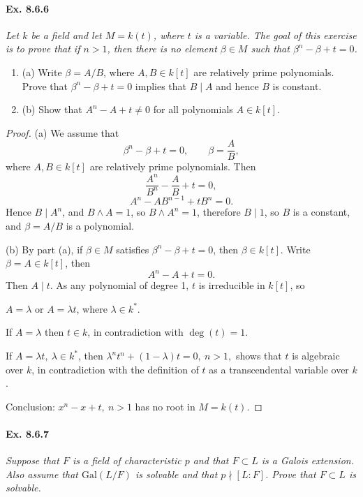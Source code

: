 \documentclass[11pt,a4paper]{article}
\newcommand{\be} {\begin{enumerate}}
\newcommand{\ee} {\end{enumerate}}
\newcommand{\Gal}{\mathrm{Gal}}
\begin{document}
\paragraph{Ex. 8.6.6}

{\it Let $k$ be a field and let $M = k(t)$, where $t$ is a variable. The goal of this exercise is to prove that if $n>1$, then there is no element $\beta \in M$ such that $\beta^n - \beta + t = 0$.
\be
\item[(a)] Write $\beta = A/B$, where $A,B \in k[t]$ are relatively prime polynomials. Prove that $\beta^n - \beta + t = 0$ implies that $B \mid A$ and hence $B$ is constant.
\item[(b)] Show that $A^n-A+t\ne 0$ for all polynomials $A\in k[t]$.
\ee
}

\begin{proof}
\item[(a)] We assume that
$$\beta^n-\beta + t = 0, \qquad \beta = \frac{A}{B}, $$
where $A,B \in k[t]$ are relatively prime polynomials.
Then
$$\frac{A^n}{B^n} - \frac{A}{B} + t = 0,$$
$$A^n - A B^{n-1} + tB^n = 0.$$
Hence $B \mid A^n$, and $B \wedge A = 1$, so $B \wedge A^n = 1$, therefore $B \mid 1$, so $B$ is a constant, and $\beta = A/B$ is a polynomial.

\item[(b)] By part (a), if $\beta \in M$ satisfies $\beta^n-\beta + t= 0$, then $\beta \in k[t]$. Write $\beta = A \in k[t]$, then
$$A^n - A +t = 0.$$
Then $A \mid t$. As any polynomial of degree 1, $t$ is irreducible in $k[t]$, so 
\begin{center}
$A= \lambda $ or $A = \lambda t$, where $\lambda \in k^*$.
\end{center}
If $A = \lambda$ then $t \in k$, in contradiction with $\deg(t) = 1$. 

If $A = \lambda t,\  \lambda \in k^*$, then $\lambda^n t^n + (1- \lambda) t = 0, \ n>1,$ shows that $t$ is algebraic over $k$, in contradiction with the definition of $t$ as a transcendental variable over $k$.

Conclusion: $x^n - x + t, \ n>1$ has no root in $M = k(t)$.
\end{proof}

\paragraph{Ex. 8.6.7}

{\it Suppose that $F$ is a field of characteristic $p$ and that $F \subset L$ is a Galois extension. Also assume that $\Gal(L/F)$ is solvable and that $p \nmid [L:F]$. Prove that $F \subset L$ is solvable.
}
\end{document}
